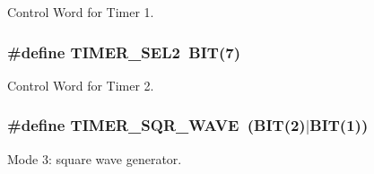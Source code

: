Control Word for Timer 1. 

\subsubsection[{\texorpdfstring{T\+I\+M\+E\+R\+\_\+\+S\+E\+L2}{TIMER_SEL2}}]{\setlength{\rightskip}{0pt plus 5cm}\#define T\+I\+M\+E\+R\+\_\+\+S\+E\+L2~{\bf B\+IT}(7)}\hypertarget{group__i8254_ga142a255de0dbc48aeabd45fc10c33672}{}\label{group__i8254_ga142a255de0dbc48aeabd45fc10c33672}


Control Word for Timer 2. 

\subsubsection[{\texorpdfstring{T\+I\+M\+E\+R\+\_\+\+S\+Q\+R\+\_\+\+W\+A\+VE}{TIMER_SQR_WAVE}}]{\setlength{\rightskip}{0pt plus 5cm}\#define T\+I\+M\+E\+R\+\_\+\+S\+Q\+R\+\_\+\+W\+A\+VE~({\bf B\+IT}(2)$\vert${\bf B\+IT}(1))}\hypertarget{group__i8254_ga4745cbf21da3d3fea5dbb080b2b73bac}{}\label{group__i8254_ga4745cbf21da3d3fea5dbb080b2b73bac}


Mode 3\+: square wave generator. 

